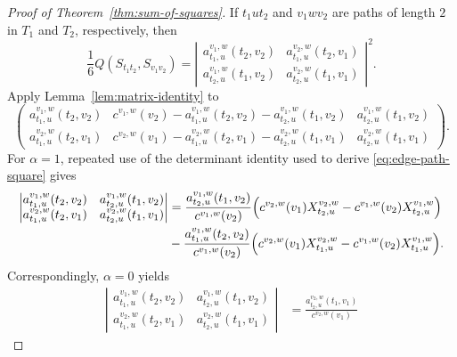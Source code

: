 \documentclass[12pt]{article}
\begin{document}
\begin{proof}[Proof of Theorem~\ref{thm:sum-of-squares}]
If $t_1ut_2$ and $v_1wv_2$ are paths of length $2$ in $T_1$ and $T_2$,
respectively, then
\begin{equation}\label{eq:display-039}
\frac16Q(S_{t_1t_2},S_{v_1v_2})=
\left|
\begin{matrix}
a_{t_1,u}^{v_1,w}(t_2,v_2)&a_{t_1,u}^{v_2,w}(t_2,v_1)\\
a_{t_2,u}^{v_1,w}(t_1,v_2)&a_{t_2,u}^{v_2,w}(t_1,v_1)
\end{matrix}
\right|^2.
\end{equation}
Apply Lemma~\ref{lem:matrix-identity} to
\begingroup
\small
\setlength{\arraycolsep}{12pt}
\renewcommand{\arraystretch}{1.12}
\begin{equation}\label{eq:display-040}
\begin{pmatrix}
a_{t_1,u}^{v_1,w}(t_2,v_2)&
c^{v_1,w}(v_2)-a_{t_1,u}^{v_1,w}(t_2,v_2)-a_{t_2,u}^{v_1,w}(t_1,v_2)&
a_{t_2,u}^{v_1,w}(t_1,v_2)\\
a_{t_1,u}^{v_2,w}(t_2,v_1)&
c^{v_2,w}(v_1)-a_{t_1,u}^{v_2,w}(t_2,v_1)-a_{t_2,u}^{v_2,w}(t_1,v_1)&
a_{t_2,u}^{v_2,w}(t_1,v_1)
\end{pmatrix}.
\end{equation}
\endgroup
For $\alpha=1$, repeated use of the determinant identity used to derive
\eqref{eq:edge-path-square} gives
\begin{equation}\label{eq:display-041}
\begin{aligned}
\left|
\begin{matrix}
a_{t_1,u}^{v_1,w}(t_2,v_2)&a_{t_2,u}^{v_1,w}(t_1,v_2)\\
a_{t_1,u}^{v_2,w}(t_2,v_1)&a_{t_2,u}^{v_2,w}(t_1,v_1)
\end{matrix}
\right|
&=\frac{a_{t_2,u}^{v_1,w}(t_1,v_2)}{c^{v_1,w}(v_2)}
\Bigl(c^{v_2,w}(v_1)X_{t_2,u}^{v_2,w}
-c^{v_1,w}(v_2)X_{t_2,u}^{v_1,w}\Bigr)                         \\
&-\frac{a_{t_1,u}^{v_1,w}(t_2,v_2)}{c^{v_1,w}(v_2)}
\Bigl(c^{v_2,w}(v_1)X_{t_1,u}^{v_2,w}
-c^{v_1,w}(v_2)X_{t_1,u}^{v_1,w}\Bigr).
\end{aligned}
\end{equation}
Correspondingly, $\alpha=0$ yields
\begin{equation}\label{eq:display-042}
\begin{aligned}
\left|
\begin{matrix}
a_{t_1,u}^{v_1,w}(t_2,v_2)&a_{t_2,u}^{v_1,w}(t_1,v_2)\\
a_{t_1,u}^{v_2,w}(t_2,v_1)&a_{t_2,u}^{v_2,w}(t_1,v_1)
\end{matrix}
\right|
&=\frac{a_{t_2,u}^{v_2,w}(t_1,v_1)}{c^{v_2,w}(v_1)}

\end{aligned}
\end{equation}
\end{proof}
\end{document}
